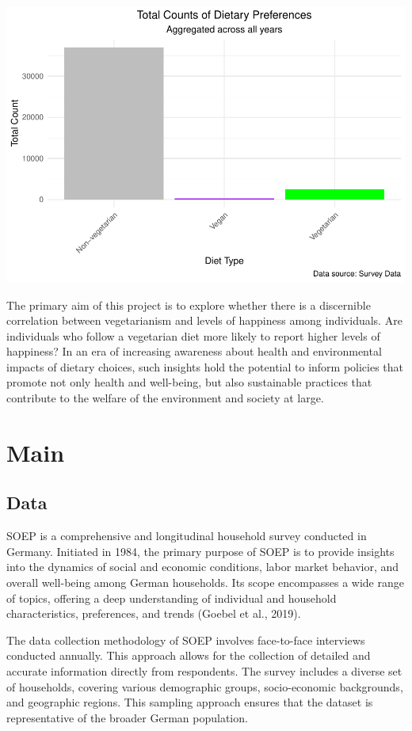 \documentclass[
]{article}
\begin{document}
\includegraphics{Final-v2_files/figure-latex/Vegetarianismavg-1.pdf}

The primary aim of this project is to explore whether there is a
discernible correlation between vegetarianism and levels of happiness
among individuals. Are individuals who follow a vegetarian diet more
likely to report higher levels of happiness? In an era of increasing
awareness about health and environmental impacts of dietary choices,
such insights hold the potential to inform policies that promote not
only health and well-being, but also sustainable practices that
contribute to the welfare of the environment and society at large.

\section{Main}\label{main}

\subsection{Data}\label{data}

SOEP is a comprehensive and longitudinal household survey conducted in
Germany. Initiated in 1984, the primary purpose of SOEP is to provide
insights into the dynamics of social and economic conditions, labor
market behavior, and overall well-being among German households. Its
scope encompasses a wide range of topics, offering a deep understanding
of individual and household characteristics, preferences, and trends
(Goebel et al., 2019).

The data collection methodology of SOEP involves face-to-face interviews
conducted annually. This approach allows for the collection of detailed
and accurate information directly from respondents. The survey includes
a diverse set of households, covering various demographic groups,
socio-economic backgrounds, and geographic regions. This sampling
approach ensures that the dataset is representative of the broader
German population.
\end{document}

